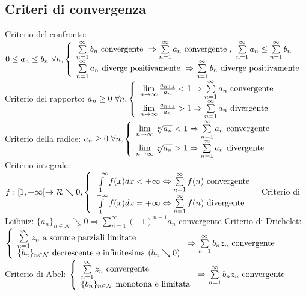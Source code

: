 \documentclass[]{article}
\newcommand{\serie}{\sum\limits_{n=1}^{\infty}}
\newcommand{\linf}{\lim\limits_{n \to \infty}}
\newcommand{\conv}{\textnormal{ convergente }}
\newcommand{\dive}{\textnormal{ divergente }}
\begin{document}
\subsection{Criteri di convergenza}
Criterio del confronto: \(0\le a_n \le b_n \ \forall n, \left\{\begin{array}{l}
\serie b_n \conv \Rightarrow \serie a_n \conv, \ \serie a_n \le \serie b_n \\
\serie a_n \textnormal{ diverge positivamente } \Rightarrow \serie b_n \textnormal{ diverge positivamente }
\end{array}\right.\)\newline
Criterio del rapporto: \(a_n\ge0 \ \forall n, \left\{\begin{array}{l}
\linf\frac{a_{n+1}}{a_n}<1 \Rightarrow \serie a_n \conv \\
\linf\frac{a_{n+1}}{a_n}>1 \Rightarrow \serie a_n \dive
\end{array}\right. \) \newline
Criterio della radice: \(a_n\ge 0 \ \forall n,\left\{\begin{array}{l}
\linf \sqrt[n]{a_n}<1 \Rightarrow \serie a_n \conv \\
\linf \sqrt[n]{a_n}>1 \Rightarrow \serie a_n \dive
\end{array}\right.\) \newline
Criterio integrale: \(f:[1,+\infty[\to \mathcal{R} \searrow 0, \left\{\begin{array}{l}
\int\limits_{1}^{+\infty}{f(x)dx}<+\infty \Leftrightarrow \serie f(n) \conv \\
\int\limits_{1}^{+\infty}{f(x)dx}=+\infty \Leftrightarrow \serie f(n) \dive
\end{array}\right. \) \newline
Criterio di Leibniz: \(\{a_n\}_{n\in\mathcal{N}}\searrow 0 \Rightarrow \serie (-1)^{n-1}a_n\) \conv \newline
Criterio di Drichelet: \(\left\{\begin{array}{l}
\serie z_n \textnormal{ a somme parziali limitate } \\
\{b_n\}_{n\in\mathcal{N}} \textnormal{ decrescente e infinitesima } (b_n \searrow 0)
\end{array}\right. \Rightarrow \serie b_n z_n \conv\) \newline
Criterio di Abel: \(\left\{\begin{array}{l}
\serie z_n \conv \\
\{b_n\}_{n\in\mathcal{N}} \textnormal{ monotona e limitata}
\end{array}\right. \Rightarrow \serie b_n z_n \conv\)
\end{document}
